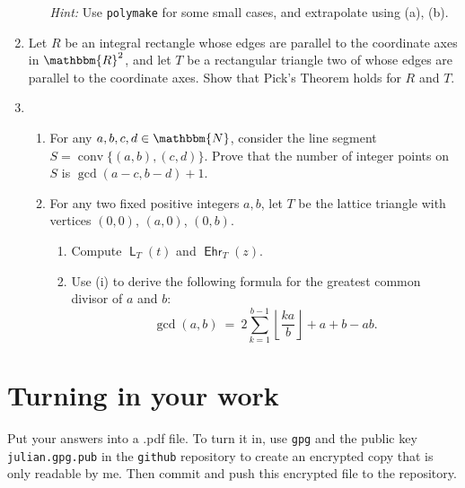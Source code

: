 \documentclass[11pt]{amsart}
\newcommand{\N}{\mathbbm{N}}
\newcommand{\R}{\mathbbm{R}}
\DeclareMathOperator{\conv}{conv}
\DeclareMathOperator{\LL}{\mathsf{L}}
\DeclareMathOperator{\Ehr}{\mathsf{Ehr}}
\begin{document}
\begin{enumerate}
\begin{enumerate}
\emph{Hint:} Use \texttt{polymake} for some small cases, and extrapolate using (a), (b).
\end{enumerate}

\item Let $R$ be an integral rectangle whose edges are parallel to the coordinate axes in $\R^2$, and let $T$ be a rectangular triangle two of whose edges are parallel to the coordinate axes. Show that Pick's Theorem holds for $R$ and $T$.

\item
  \begin{enumerate}
  \item For any $a,b,c,d\in\N$, consider the line segment $S=\conv\{(a,b),(c,d)\}$. Prove that the number of integer points on $S$ is $\gcd(a-c, b-d) + 1$.
  \item For any two fixed positive integers $a,b$, let $T$ be the lattice triangle with vertices $(0,0)$, $(a,0)$, $(0,b)$. 

\begin{enumerate}
\item\label{ex2:i} Compute $\LL_T(t)$ and $\Ehr_T(z)$.
\item Use (i) to derive the following formula for the greatest common divisor of $a$ and $b$:
\[
   \gcd(a,b) 
   \ = \
   2\sum_{k=1}^{b-1}\left\lfloor\frac{ka}{b}\right\rfloor 
   + a + b - ab.
\]
\end{enumerate}
  \end{enumerate}

\end{enumerate}




\bigskip
\section*{Turning in your work}

Put your answers into a .pdf file. To turn it in, use \texttt{gpg} and the public key \texttt{julian.gpg.pub} in the \texttt{github} repository to create an encrypted copy that is only readable by me. Then commit and push this encrypted file to the repository.
\end{document}

